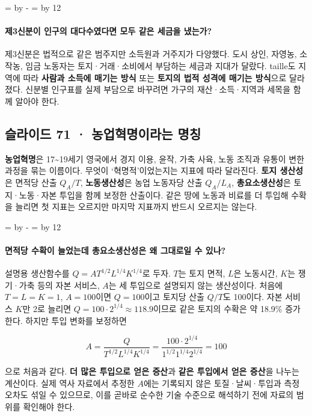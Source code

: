 \documentclass[10pt,a4paper]{article}
\newcommand{\ReserveQuestionSpace}{%
  \par\begingroup
  \dimen0=\pagegoal \advance\dimen0 by -\pagetotal
  \dimen2=\baselineskip \multiply\dimen2 by 12
  \ifdim\dimen0<\dimen2 \newpage\fi
  \endgroup}
\begin{document}
\ReserveQuestionSpace
\paragraph{제3신분이 인구의 대다수였다면 모두 같은 세금을 냈는가?}
제3신분은 법적으로 같은 범주지만 소득원과 거주지가 다양했다. 도시 상인, 자영농, 소작농, 임금 노동자는 토지·거래·소비에서 부담하는 세금과 지대가 달랐다. taille도 지역에 따라 \textbf{사람과 소득에 매기는 방식} 또는 \textbf{토지의 법적 성격에 매기는 방식}으로 달라졌다. 신분별 인구표를 실제 부담으로 바꾸려면 가구의 재산·소득·지역과 세목을 함께 알아야 한다.\par

\subsection{슬라이드 71 · 농업혁명이라는 명칭}
\textbf{농업혁명}은 17\textasciitilde{}19세기 영국에서 경지 이용, 윤작, 가축 사육, 노동 조직과 유통이 변한 과정을 묶는 이름이다. 무엇이 ‘혁명적’이었는지는 지표에 따라 달라진다. \textbf{토지 생산성}은 면적당 산출 $Q_A/T$, \textbf{노동생산성}은 농업 노동자당 산출 $Q_A/L_A$, \textbf{총요소생산성}은 토지·노동·자본 투입을 함께 보정한 산출이다. 같은 땅에 노동과 비료를 더 투입해 수확을 늘리면 첫 지표는 오르지만 마지막 지표까지 반드시 오르지는 않는다.\par

\ReserveQuestionSpace
\paragraph{면적당 수확이 늘었는데 총요소생산성은 왜 그대로일 수 있나?}
설명용 생산함수를 $Q=A T^{1/2}L^{1/4}K^{1/4}$로 두자. $T$는 토지 면적, $L$은 노동시간, $K$는 쟁기·가축 등의 자본 서비스, $A$는 세 투입으로 설명되지 않는 생산성이다. 처음에 $T=L=K=1$, $A=100$이면 $Q=100$이고 토지당 산출 $Q/T$도 100이다. 자본 서비스 $K$만 2로 늘리면 $Q=100\cdot2^{1/4}\approx118.9$이므로 같은 토지의 수확은 약 18.9\% 증가한다. 하지만 투입 변화를 보정하면\par

\[
A=\frac{Q}{T^{1/2}L^{1/4}K^{1/4}}
=\frac{100\cdot2^{1/4}}{1^{1/2}1^{1/4}2^{1/4}}=100
\]

으로 처음과 같다. \textbf{더 많은 투입으로 얻은 증산}과 \textbf{같은 투입에서 얻은 증산}을 나누는 계산이다. 실제 역사 자료에서 추정한 $A$에는 기록되지 않은 토질·날씨·투입과 측정 오차도 섞일 수 있으므로, 이를 곧바로 순수한 기술 수준으로 해석하기 전에 자료의 범위를 확인해야 한다.\par
\end{document}
